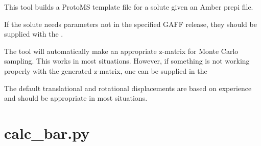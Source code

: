 \documentclass[letterpaper,10pt,english]{sphinxmanual}
\begin{document}

%
\begin{sphinxVerbatim}[commandchars=\\\{\}]
  
    
        
        
\end{sphinxVerbatim}


This tool builds a ProtoMS template file for a solute given an Amber prepi file.

If the solute needs parameters not in the specified GAFF release, they should be supplied with the .

The tool will automatically make an appropriate z-matrix for Monte Carlo sampling. This works in most situations. However, if something is not working properly with the generated z-matrix, one can be supplied in the 

The default translational and rotational displacements are based on experience and should be appropriate in most situations.


\section{calc\_bar.py}
\label{\detokenize{tools:calc-bar-py}}

%
\begin{sphinxVerbatim}[commandchars=\\\{\}]
  
  
  
   
\end{sphinxVerbatim}
\end{document}
